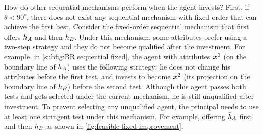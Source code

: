 How do other sequential mechanisms perform when the agent invests?
First, if $\theta<90^{\circ}$, there does not exist any sequential mechanism with fixed order that can achieve the first best.
Consider the fixed-order sequential mechanism that first offers $h_A$ and then $h_B$.
Under this mechanism, some attributes prefer using a two-step strategy and they do not become qualified after the investment. 
For example, in \cref{subfig:BR sequential fixed},  the agent with attributes $\boldsymbol{x}^0$ (on the boundary line of $h_A$) uses the following strategy: he does not change his attributes before the first test, and invests to become $\boldsymbol{x}^2$ (its projection on the boundary line of $h_B$) before the second test.
Although this agent passes both tests and gets selected under the current mechanism, he is still unqualified after investment.
To prevent selecting any unqualified agent, the principal needs to use at least one stringent test under this mechanism.
For example, offering $\tilde{h}_A$ first and then $h_B$ as shown in \cref{fig:feasible fixed improvement}. 

